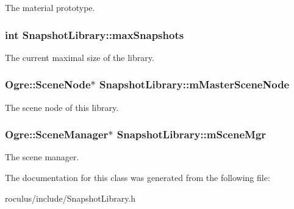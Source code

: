 \-The material prototype. \hypertarget{classSnapshotLibrary_a8d1f7abf98dbb1f9cb8e82657218b850}{
\subsubsection[{max\-Snapshots}]{\setlength{\rightskip}{0pt plus 5cm}int {\bf \-Snapshot\-Library\-::max\-Snapshots}}}\label{classSnapshotLibrary_a8d1f7abf98dbb1f9cb8e82657218b850}
\-The current maximal size of the library. \hypertarget{classSnapshotLibrary_aa510467111273c06dceeb3435d586e66}{
\subsubsection[{m\-Master\-Scene\-Node}]{\setlength{\rightskip}{0pt plus 5cm}\-Ogre\-::\-Scene\-Node$\ast$ {\bf \-Snapshot\-Library\-::m\-Master\-Scene\-Node}}}\label{classSnapshotLibrary_aa510467111273c06dceeb3435d586e66}
\-The scene node of this library. \hypertarget{classSnapshotLibrary_a59737af324c6e35b0fe67b1ad60b8a8a}{
\subsubsection[{m\-Scene\-Mgr}]{\setlength{\rightskip}{0pt plus 5cm}\-Ogre\-::\-Scene\-Manager$\ast$ {\bf \-Snapshot\-Library\-::m\-Scene\-Mgr}}}\label{classSnapshotLibrary_a59737af324c6e35b0fe67b1ad60b8a8a}
\-The scene manager. 

\-The documentation for this class was generated from the following file\-:\begin{DoxyCompactItemize}
\item 
roculus/include/\-Snapshot\-Library.\-h\end{DoxyCompactItemize}
